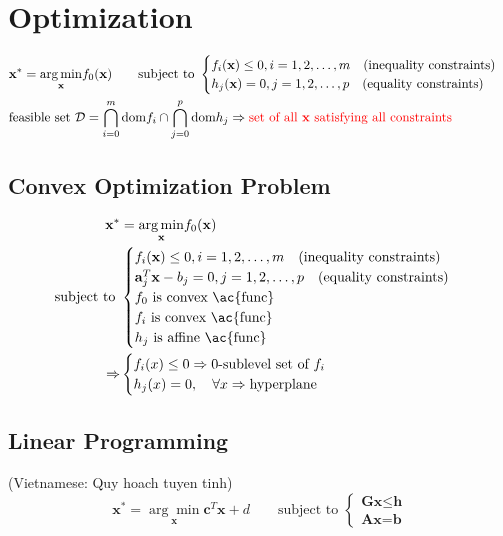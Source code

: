 \chapter{Optimization}

\begin{align}
	&\textbf{x}^* = \underset{\textbf{x}}{\arg\min} f_0(\textbf{x}) \qquad \text{subject to } \begin{cases}
		f_i(\textbf{x}) \leq 0, i=1, 2, \dots, m \quad \text{(inequality constraints)}\\
		h_j(\textbf{x}) = 0, j=1, 2, \dots, p \quad \text{(equality constraints)}
	\end{cases}\\
	&\text{feasible set } \mathcal{D} = \bigcap^m_{i=0}\text{dom}f_i \cap \bigcap^p_{j=0}\text{dom}h_j \Rightarrow {\color{red} \text{set of all \textbf{x} satisfying all constraints}}
\end{align}

\section{Convex Optimization Problem}
\begin{align}
	\textbf{x}^* &= \underset{\textbf{x}}{\arg\min} f_0(\textbf{x}) \\
	\text{subject to } &\begin{cases}
		f_i(\textbf{x}) \leq 0, i=1, 2, \dots, m \quad \text{(inequality constraints)}\\
		\textbf{a}^T_j \textbf{x} -b_j = 0, j=1, 2, \dots, p \quad \text{(equality constraints)}\\
		f_0 \text{ is convex \ac{func}}\\
		f_i \text{ is convex \ac{func}}\\
		h_j \text{ is affine \ac{func}}
	\end{cases}\\
	\Rightarrow &\begin{cases}
		f_i(x) \leq 0 \Rightarrow 0\text{-sublevel set of }f_i\\
		h_j(x) = 0, \quad \forall x \Rightarrow \text{hyperplane}
	\end{cases}
\end{align}

\section{Linear Programming}
(Vietnamese: Quy hoach tuyen tinh)\\
\begin{equation}
	\textbf{x}^* = \underset{\textbf{x}}{\arg\min} \textbf{c}^T \textbf{x} +d \qquad \text{subject to } \begin{cases}
		\textbf{Gx} \leq \textbf{h}\\
		\textbf{Ax} = \textbf{b}
	\end{cases}
\end{equation}

